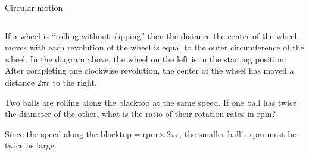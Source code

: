 \documentclass[9pt,aspectratio=169]{beamer}
\begin{document}
\begin{frame}{Circular motion}
\begin{columns}[T]
\begin{column}{0.5\textwidth}
\begin{center}
      \end{center}
      \begin{example}
        If a wheel is “rolling without slipping” then the distance the center of the wheel moves with each revolution of the wheel is equal to the outer circumference of the wheel.  In the diagram above, the wheel on the left is in the starting position.  After completing one clockwise revolution, the center of the wheel has moved a distance $2\pi r$ to the right.
      \end{example}
      \begin{problem}
        Two balls are rolling along the blacktop at the same speed.  If one ball has twice the diameter of the other, what is the ratio of their rotation rates in rpm?
      \end{problem}
      Since the speed along the blacktop$ = \text{rpm} \times 2\pi r$, the smaller ball’s rpm must be twice as large.
    \end{column}
  \end{columns}
\end{frame}
\end{document}
